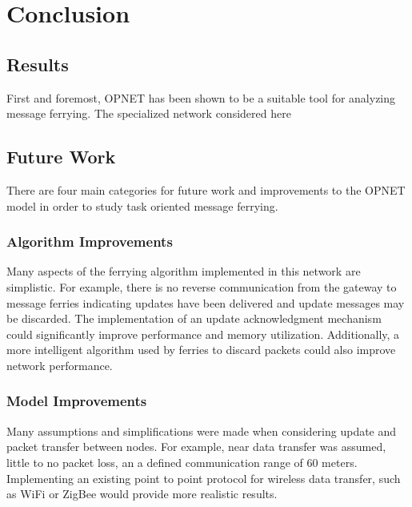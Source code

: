 \chapter{Conclusion} 

\section{Results}

First and foremost, OPNET has been shown to be a suitable tool for analyzing message ferrying.
The specialized network considered here 


\section{Future Work}

There are four main categories for future work and improvements to the OPNET model in order to study task oriented message ferrying.

\subsection{Algorithm Improvements}

Many aspects of the ferrying algorithm implemented in this network are simplistic.
For example, there is no reverse communication from the gateway to message ferries indicating updates have been delivered and update messages may be discarded.
The implementation of an update acknowledgment mechanism could significantly improve performance and memory utilization.
Additionally, a more intelligent algorithm used by ferries to discard packets could also improve network performance.

\subsection{Model Improvements}

Many assumptions and simplifications were made when considering update and packet transfer between nodes.
For example, near data transfer was assumed, little to no packet loss, an a defined communication range of 60 meters.
Implementing an existing point to point protocol for wireless data transfer, such as WiFi or ZigBee would provide more realistic results.

